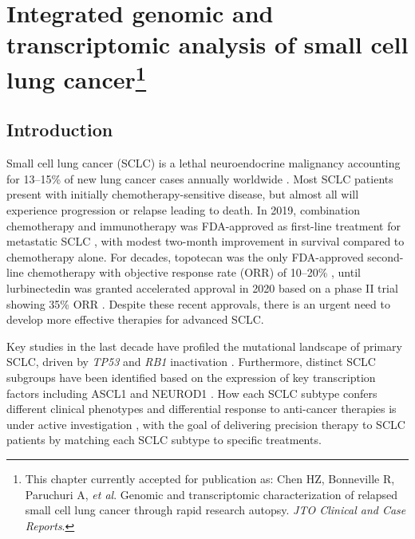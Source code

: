 \chapter[Integrated genomic and transcriptomic analysis of small cell lung cancer]{Integrated genomic and transcriptomic analysis of small cell lung cancer\footnote{This chapter currently accepted for publication as: Chen HZ\cofirst, Bonneville R\cofirst, Paruchuri A\cofirst, \textit{et al}. Genomic and transcriptomic characterization of relapsed small cell lung cancer through rapid research autopsy. \textit{JTO Clinical and Case Reports}.}}
\label{ch:sclc}

\section{Introduction}
Small cell lung cancer (SCLC) is a lethal neuroendocrine malignancy accounting for 13--15\% of new lung cancer cases annually worldwide \cite{sabari2017,siegel2019}. Most SCLC patients present with initially chemotherapy-sensitive disease, but almost all will experience progression or relapse leading to death. In 2019, combination chemotherapy and immunotherapy was FDA-approved as first-line treatment for metastatic SCLC \cite{horn2018,pazares2019}, with modest two-month improvement in survival compared to chemotherapy alone. For decades, topotecan was the only FDA-approved second-line chemotherapy with objective response rate (ORR) of 10--20\% \cite{pawel1999}, until lurbinectedin was granted accelerated approval in 2020 based on a phase II trial showing 35\% ORR \cite{trigo2020}. Despite these recent approvals, there is an urgent need to develop more effective therapies for advanced SCLC\@.

Key studies in the last decade have profiled the mutational landscape of primary SCLC, driven by \textit{TP53} and \textit{RB1} inactivation \cite{george2015,rudin2012,peifer2012}. Furthermore, distinct SCLC subgroups have been identified based on the expression of key transcription factors including ASCL1 and NEUROD1 \cite{rudin2019,baine2020}. How each SCLC subtype confers different clinical phenotypes and differential response to anti-cancer therapies is under active investigation \cite{gay2021}, with the goal of delivering precision therapy to SCLC patients by matching each SCLC subtype to specific treatments. 

